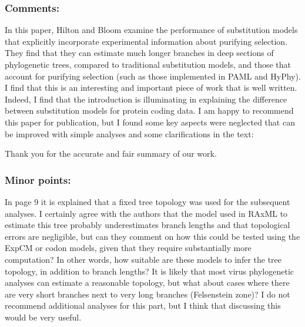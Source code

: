 \documentclass[11pt, oneside]{article}   	%
\newcommand{\response}[1]{{\color{black}#1}}
\begin{document}
\subsubsection*{Comments:} 
In this paper, Hilton and Bloom examine the performance of substitution models that explicitly incorporate experimental information about purifying selection. 
They find that they can estimate much longer branches in deep sections of phylogenetic trees, compared to traditional substitution models, and those that account for purifying selection (such as those implemented in PAML and HyPhy). 
I find that this is an interesting and important piece of work that is well written. 
Indeed, I find that the introduction is illuminating in explaining the difference between substitution models for protein coding data. 
I am happy to recommend this paper for publication, but I found some key aspects were neglected that can be improved with simple analyses and some clarifications in the text: 

\response{Thank you for the accurate and fair summary of our work.}

\subsubsection*{Minor points:} 

In page 9 it is explained that a fixed tree topology was used for the subsequent analyses. 
I certainly agree with the authors that the model used in RAxML to estimate this tree probably underestimates branch lengths and that topological errors are negligible, but can they comment on how this could be tested using the ExpCM or codon models, given that they require substantially more computation? 
In other words, how suitable are these models to infer the tree topology, in addition to branch lengths? 
It is likely that most virus phylogenetic analyses can estimate a reasonable topology, but what about cases where there are very short branches next to very long branches (Felsenstein zone)? 
I do not recommend additional analyses for this part, but I think that discussing this would be very useful. 
\end{document}
